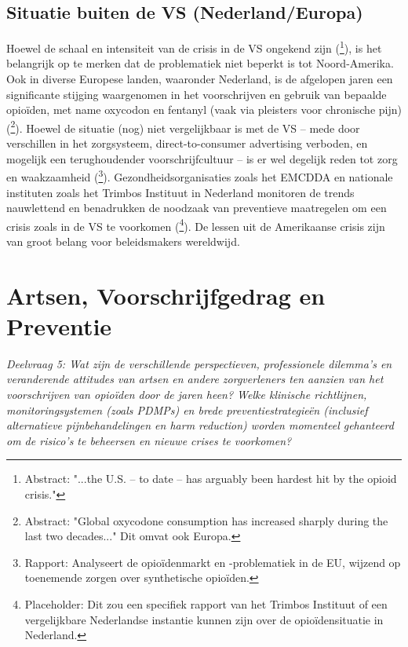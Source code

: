 \documentclass[11pt, a4paper]{report} %
\begin{document}
\section{Situatie buiten de VS (Nederland/Europa)}
Hoewel de schaal en intensiteit van de crisis in de VS ongekend zijn (\cite{Maclean2020EconomicStudiesOpioid}\footnote{Abstract: "...the U.S. -- to date -- has arguably been hardest hit by the opioid crisis."}), is het belangrijk op te merken dat de problematiek niet beperkt is tot Noord-Amerika. Ook in diverse Europese landen, waaronder Nederland, is de afgelopen jaren een significante stijging waargenomen in het voorschrijven en gebruik van bepaalde opioïden, met name oxycodon en fentanyl (vaak via pleisters voor chronische pijn) (\cite{Kinnunen2019UpdatedOxycodonePKPD}\footnote{Abstract: "Global oxycodone consumption has increased sharply during the last two decades..." Dit omvat ook Europa.}). Hoewel de situatie (nog) niet vergelijkbaar is met de VS – mede door verschillen in het zorgsysteem, direct-to-consumer advertising verboden, en mogelijk een terughoudender voorschrijfcultuur – is er wel degelijk reden tot zorg en waakzaamheid (\cite{EMCDDA2024HeroinGlobal}\footnote{Rapport: Analyseert de opioïdenmarkt en -problematiek in de EU, wijzend op toenemende zorgen over synthetische opioïden.}). Gezondheidsorganisaties zoals het EMCDDA en nationale instituten zoals het Trimbos Instituut in Nederland monitoren de trends nauwlettend en benadrukken de noodzaak van preventieve maatregelen om een crisis zoals in de VS te voorkomen (\cite{SomeDutchReportOnOpioids}\footnote{Placeholder: Dit zou een specifiek rapport van het Trimbos Instituut of een vergelijkbare Nederlandse instantie kunnen zijn over de opioïdensituatie in Nederland.}). De lessen uit de Amerikaanse crisis zijn van groot belang voor beleidsmakers wereldwijd.
\chapter{Artsen, Voorschrijfgedrag en Preventie}
\label{ch:artsen_preventie}
\textit{Deelvraag 5: Wat zijn de verschillende perspectieven, professionele dilemma's en veranderende attitudes van artsen en andere zorgverleners ten aanzien van het voorschrijven van opioïden door de jaren heen? Welke klinische richtlijnen, monitoringsystemen (zoals PDMPs) en brede preventiestrategieën (inclusief alternatieve pijnbehandelingen en harm reduction) worden momenteel gehanteerd om de risico's te beheersen en nieuwe crises te voorkomen?}
\end{document}
